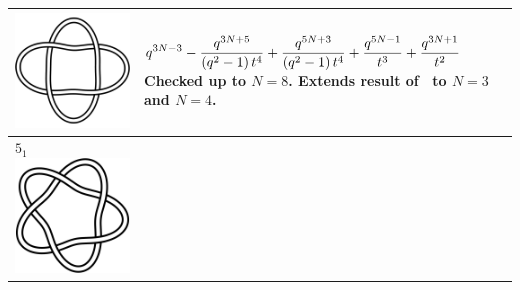 \documentclass{compositio}
\theoremstyle{definition}
\numberwithin{equation}{section}
\begin{document}
{\begin{longtable}{p{}|p{}}
\includegraphics[scale=0.07,angle=0]{link4_1_2.pdf} 
& 
\newline
$
\displaystyle{%
q^{3 N-3}-\frac{q^{3N+5}}{\left(q^2-1\right) t^4}+\frac{q^{5 N+3}}{\left(q^2-1\right) t^4}+\frac{q^{5 N-1}}{t^3}+\frac{q^{3 N+1}}{t^2}
}
$
\newline\newline\newline
Checked up to $N=8$. Extends result of~\cite{r0508510} to $N=3$ and $N=4$. 
\\
\hline
$5_{1}$ 
\includegraphics[scale=0.07,angle=0]{knot5_1.pdf} 

\end{longtable}}
\end{document}
